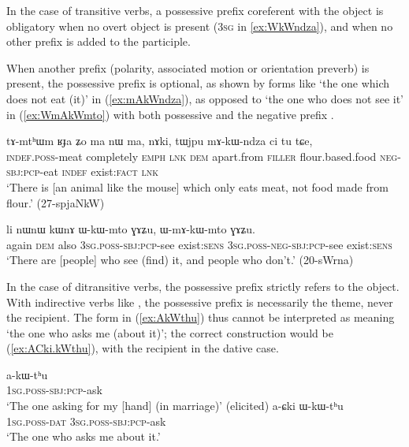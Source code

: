 In the case of transitive verbs, a possessive prefix coreferent with the object is obligatory when no overt object is present (\textsc{3sg}  in \ref{ex:WkWndza}), and when no other prefix is added to the participle.

When another prefix (polarity, associated motion or orientation preverb) is present, the possessive prefix is optional, as shown by forms like  `the one which does not eat (it)' in (\ref{ex:mAkWndza}), as opposed to  `the one who does not see it' in (\ref{ex:WmAkWmto}) with both possessive  and the negative prefix .

 \begin{exe} 
\ex \label{ex:mAkWndza}
\gll  tɤ-mtʰɯm ʁɟa ʑo ma nɯ ma, nɤki, tɯjpu mɤ-kɯ-ndza ci tu tɕe, \\
\textsc{indef}.\textsc{poss}-meat completely \textsc{emph} \textsc{lnk} \textsc{dem} apart.from \textsc{filler} flour.based.food \textsc{neg}-\textsc{sbj}:\textsc{pcp}-eat \textsc{indef} exist:\textsc{fact} \textsc{lnk} \\
\glt  `There is  [an animal like the mouse] which only eats meat, not food made from flour.' (27-spjaNkW)
\end{exe}

 \begin{exe} 
\ex \label{ex:WmAkWmto} 
\gll  li nɯnɯ kɯnɤ ɯ-kɯ-mto ɣɤʑu, ɯ-mɤ-kɯ-mto ɣɤʑu. \\
again \textsc{dem} also \textsc{3sg}.\textsc{poss}-\textsc{sbj}:\textsc{pcp}-see exist:\textsc{sens} \textsc{3sg}.\textsc{poss}-\textsc{neg}-\textsc{sbj}:\textsc{pcp}-see exist:\textsc{sens} \\
\glt `There are [people] who see (find) it, and people who don't.' (20-sWrna)
\end{exe}

In the case of ditransitive verbs, the possessive prefix strictly refers to the object. With indirective verbs like , the possessive prefix is necessarily the theme, never the recipient. The form in (\ref{ex:AkWthu}) thus cannot be interpreted as meaning `the one who asks me (about it)'; the correct construction would be (\ref{ex:ACki.kWthu}), with the recipient in the dative case.

\begin{exe}
\ex \label{ex:AkWthu}
\gll a-kɯ-tʰu  \\
\textsc{1sg}.\textsc{poss}-\textsc{sbj}:\textsc{pcp}-ask \\
\glt `The one asking for my [hand] (in marriage)' (elicited)
\ex \label{ex:ACki.kWthu}
\gll a-ɕki ɯ-kɯ-tʰu  \\
\textsc{1sg}.\textsc{poss}-\textsc{dat} \textsc{3sg}.\textsc{poss}-\textsc{sbj}:\textsc{pcp}-ask \\ 
\glt `The one who asks me about it.' 
\end{exe}

